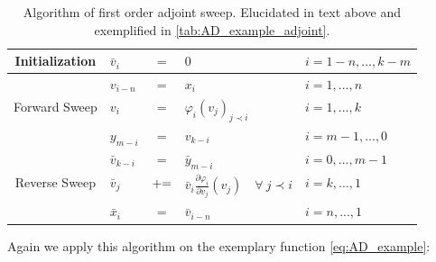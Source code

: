 \documentclass{scrartcl}[12pt, halfparskip]
\numberwithin{equation}{section}
\numberwithin{figure}{section}
\numberwithin{table}{section}
\begin{document}
\begin{table}[H]
	\centering
	\begin{tabular}{| c | l c l | l |} \hline
		Initialization & $\bar{v}_i$ & $=$ & $0$ & $i=1-n,...,k-m$ \\ \hline
		& $v_{i-n}$ & $=$ & $x_i$ & $i=1,...,n$ \\
		Forward Sweep & $v_{i}$ & $=$ & $\varphi_i(v_j)_{j \prec i}$ & $i=1,...,k$ \\
		& $y_{m-i}$ & $=$ & $v_{k-i}$ & $i=m-1,...,0$ \\ \hline
		& $\bar{v}_{k-i}$ & $=$ & $\bar{y}_{m-i}$ & $i=0,...,m-1$ \\
		Reverse Sweep & $\bar{v}_j$ & $+ \hspace{-0.1cm} =$ & $\bar{v}_i \frac{\partial \varphi_i}{\partial v_j}(v_j) \quad \forall \ j \prec i$ & $i=k,...,1$ \\
		& $\bar{x}_i$ & $=$ & $\bar{v}_{i-n}$ & $i=n,...,1$ \\ \hline
	\end{tabular}
	\caption{Algorithm of first order adjoint sweep. Elucidated in text above and exemplified in \cref{tab:AD_example_adjoint}.}
	\label{tab:first_order_adjoint_sweep}
\end{table}

Again we apply this algorithm on the exemplary function \cref{eq:AD_example}:
\end{document}
